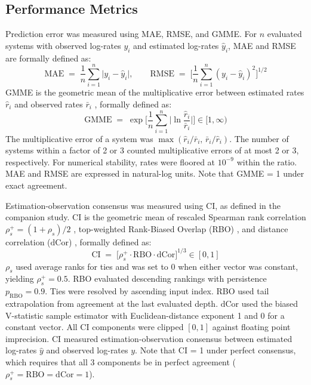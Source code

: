 \documentclass{article}
\begin{document}
\subsection*{Performance Metrics}
\label{sec:performance-metrics}
Prediction error was measured using MAE, RMSE, and GMME. For $n$ evaluated systems with observed log-rates $y_i$ and estimated log-rates $\widehat{y}_i$, MAE and RMSE are formally defined as:
\begin{equation}
    \mathrm{MAE} \;=\; \frac{1}{n}\sum_{i=1}^{n} \lvert y_i - \widehat{y}_i \rvert,
    \qquad
    \mathrm{RMSE} \;=\; \Big[\frac{1}{n}\sum_{i=1}^{n} {(y_i - \widehat{y}_i)}^{2}\Big]^{1/2}
\label{eq:mae}
\end{equation}
GMME is the geometric mean of the multiplicative error between estimated rates $\widehat{r}_i$ and observed rates $\bar{r}_i$ \citep{ref149}, formally defined as:
\begin{equation}
    \mathrm{GMME} \;=\; \exp\!\Big[\frac{1}{n}\sum_{i=1}^{n} \Big\lvert \ln\frac{\widehat{r}_i}{\bar{r}_i} \Big\rvert\Big] \in [1, \infty)
\label{eq:gmme}
\end{equation}
The multiplicative error of a system was $\max(\widehat{r}_i/\bar{r}_i,\, \bar{r}_i/\widehat{r}_i)$. The number of systems within a factor of 2 or 3 counted multiplicative errors of at most 2 or 3, respectively. For numerical stability, rates were floored at $10^{-9}$ within the ratio. MAE and RMSE are expressed in natural-log units. Note that GMME = 1 under exact agreement.

Estimation-observation consensus was measured using CI, as defined in the companion study. CI is the geometric mean of rescaled Spearman rank correlation $\rho_s^{+} = (1 + \rho_s)/2$ \citep{ref42}, top-weighted Rank-Biased Overlap (RBO) \citep{ref43}, and distance correlation ($\mathrm{dCor}$) \citep{ref44}, formally defined as:
\begin{equation}
\mathrm{CI} \;=\;
\Big[
\rho_s^{+} \cdot \mathrm{RBO} \cdot \mathrm{dCor}
\Big]^{1/3} \in [0, 1]
\label{eq:ci}
\end{equation}
$\rho_s$ used average ranks for ties and was set to 0 when either vector was constant, yielding $\rho_s^{+} = 0.5$. RBO evaluated descending rankings with persistence $p_{\mathrm{RBO}} = 0.9$. Ties were resolved by ascending input index. RBO used tail extrapolation from agreement at the last evaluated depth. $\mathrm{dCor}$ used the biased V-statistic sample estimator with Euclidean-distance exponent 1 and 0 for a constant vector. All CI components were clipped $[0, 1]$ against floating point imprecision. CI measured estimation-observation consensus between estimated log-rates $\widehat{y}$ and observed log-rates $y$. Note that CI = 1 under perfect consensus, which requires that all 3 components be in perfect agreement ($\rho_s^{+} = \mathrm{RBO} = \mathrm{dCor} = 1$).
\end{document}
